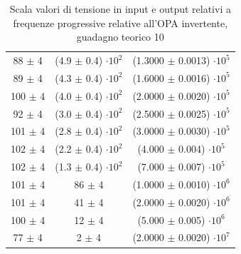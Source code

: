 \documentclass[journal]{IEEEtran}
\begin{document}
\begin{table}[H]
\begin{tabular}{c|c|c}
88 $ \pm $ 4  & (4.9 $ \pm $ 0.4) $ \cdot 10^{2} $ & (1.3000 $ \pm $ 0.0013) $ \cdot 10^{5} $ \\
89 $ \pm $ 4  & (4.3 $ \pm $ 0.4) $ \cdot 10^{2} $ & (1.6000 $ \pm $ 0.0016) $ \cdot 10^{5} $ \\
100 $ \pm $ 4 & (4.0 $ \pm $ 0.4) $ \cdot 10^{2} $ & (2.0000 $ \pm $ 0.0020) $ \cdot 10^{5} $ \\
92 $ \pm $ 4  & (3.0 $ \pm $ 0.4) $ \cdot 10^{2} $ & (2.5000 $ \pm $ 0.0025) $ \cdot 10^{5} $ \\
101 $ \pm $ 4 & (2.8 $ \pm $ 0.4) $ \cdot 10^{2} $ & (3.0000 $ \pm $ 0.0030) $ \cdot 10^{5} $ \\
102 $ \pm $ 4 & (2.2 $ \pm $ 0.4) $ \cdot 10^{2} $ & (4.000 $ \pm $ 0.004) $ \cdot 10^{5} $   \\
102 $ \pm $ 4 & (1.3 $ \pm $ 0.4) $ \cdot 10^{2} $ & (7.000 $ \pm $ 0.007) $ \cdot 10^{5} $   \\
101 $ \pm $ 4 & 86 $ \pm $ 4 & (1.0000 $ \pm $ 0.0010) $ \cdot 10^{6} $ \\
101 $ \pm $ 4 & 41 $ \pm $ 4 & (2.0000 $ \pm $ 0.0020) $ \cdot 10^{6} $ \\
100 $ \pm $ 4 & 12 $ \pm $ 4 & (5.000 $ \pm $ 0.005) $ \cdot 10^{6} $   \\
77 $ \pm $ 4  & 2 $ \pm $ 4  & (2.0000 $ \pm $ 0.0020) $ \cdot 10^{7} $
\end{tabular}
\vspace{5 mm}
\caption{Scala valori di tensione in input e output relativi a frequenze progressive relative all'OPA invertente, guadagno teorico 10}
\label{tab:opa-inv-g10}
\end{table}
\end{document}
